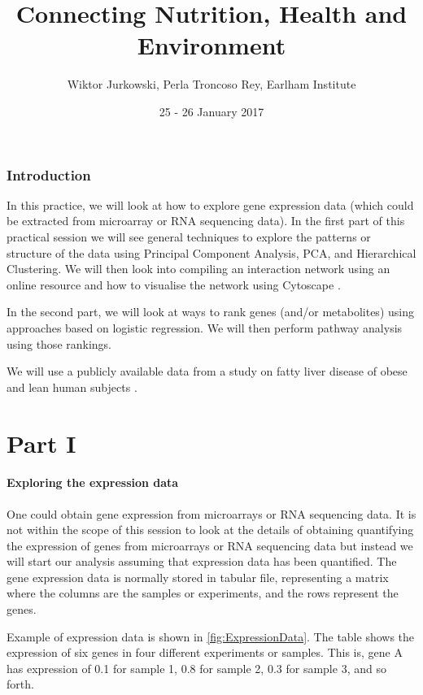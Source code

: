 \documentclass[11pt, oneside]{article}   	%
\title{Connecting Nutrition, Health and Environment }
\author{Wiktor Jurkowski, Perla Troncoso Rey, Earlham Institute}
\date{25 - 26 January 2017}	 %
\begin{document}
\maketitle

\tableofcontents

\listoffigures
\listoftables


\section{Introduction}

In this practice, we will look at how to explore  gene expression data (which could be extracted from microarray or RNA sequencing data). In the first part of this practical session we will see general techniques to explore the patterns or structure of the data using Principal Component Analysis, PCA, and Hierarchical Clustering. We will then look into compiling an interaction network using an online resource and how to visualise the network using Cytoscape \cite{}.

In the second part, we will look at ways to rank genes (and/or metabolites) using approaches based on logistic regression. We will then perform pathway analysis using those rankings.

We will use a publicly available data from a study on fatty liver disease of obese and lean human subjects \cite{}.



\part{Part I}

\subsection{Exploring the expression data}

One could obtain gene expression from microarrays or RNA sequencing data. It is not within the scope of this session to look at the details of obtaining quantifying the expression of genes from microarrays or RNA sequencing data but instead we will start our analysis assuming that expression data has been quantified.
The gene expression data is normally stored in tabular file, representing a matrix where the columns are the samples or experiments, and the rows represent the genes. 

Example of expression data is shown in \autoref{fig:ExpressionData}. The table shows the expression of six genes in four different experiments or samples. This is, gene A has expression of 0.1 for sample 1, 0.8 for sample 2, 0.3 for sample 3, and so forth. 
\end{document}
